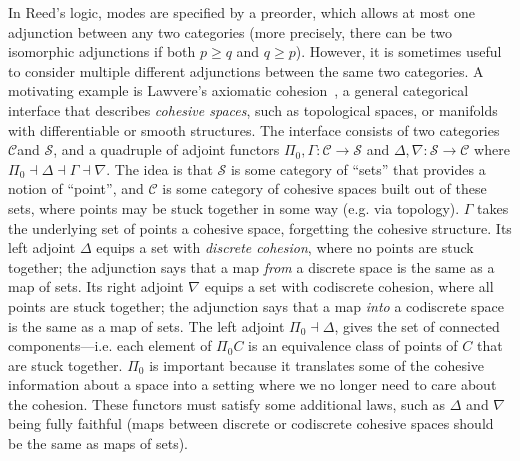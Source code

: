 \documentclass{drl-common/llncs}
\newcommand{\C}{\ensuremath{\mathcal{C}}}
\newcommand{\la}{\ensuremath{\dashv}}
\begin{document}
In Reed's logic, modes are specified by a preorder, which allows at most
one adjunction between any two categories (more precisely, there can be
two isomorphic adjunctions if both $p \ge q$ and $q \ge p$).  However,
it is sometimes useful to consider multiple different adjunctions
between the same two categories.  A motivating example is Lawvere's
axiomatic cohesion~\citep{lawvere07cohesion}, a general categorical
interface that describes \emph{cohesive spaces}, such as topological
spaces, or manifolds with differentiable or smooth structures.  The
interface consists of two categories \C and $\mathcal{S}$, and a
quadruple of adjoint functors $\Pi_0,\Gamma : \mathcal{C} \to
\mathcal{S}$ and $\Delta,\nabla : \mathcal{S} \to \mathcal{C}$ where
$\Pi_0 \la \Delta \la \Gamma \la \nabla$.  The idea is that
$\mathcal{S}$ is some category of ``sets'' that provides a notion of
``point'', and \C\/ is some category of cohesive spaces built out of
these sets, where points may be stuck together in some way (e.g. via
topology).  $\Gamma$ takes the underlying set of points a cohesive
space, forgetting the cohesive structure.  Its left adjoint $\Delta$
equips a set with \emph{discrete cohesion}, where no points are stuck
together; the adjunction says that a map \emph{from} a discrete space is
the same as a map of sets.  Its right adjoint $\nabla$ equips a set with
codiscrete cohesion, where all points are stuck together; the adjunction
says that a map \emph{into} a codiscrete space is the same as a map of
sets.  The left adjoint $\Pi_0 \la \Delta$, gives the set of connected
components---i.e. each element of $\Pi_0 C$ is an equivalence class of
points of $C$ that are stuck together.  $\Pi_0$ is important because it
translates some of the cohesive information about a space into a setting
where we no longer need to care about the cohesion.  These functors must
satisfy some additional laws, such as $\Delta$ and $\nabla$ being fully
faithful (maps between discrete or codiscrete cohesive spaces should be
the same as maps of sets).
\end{document}
